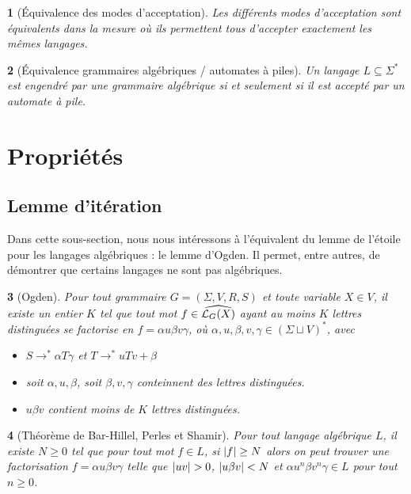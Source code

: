 \documentclass[11pt,a4paper]{article}
\theoremstyle{plain}
\newtheorem{thm}{\protect\theoremname}
\theoremstyle{definition}
\theoremstyle{definition}
\theoremstyle{remark}
\theoremstyle{remark}
\theoremstyle{plain}
\newtheorem{lem}[thm]{\protect\lemmaname}
\theoremstyle{plain}
\newtheorem{prop}[thm]{\protect\propositionname}
\theoremstyle{plain}
\newtheorem{cor}[thm]{\protect\corollaryname}
\theoremstyle{remark}
\providecommand{\corollaryname}{Corollaire}
\providecommand{\lemmaname}{Lemme}
\providecommand{\propositionname}{Proposition}
\providecommand{\theoremname}{Théorème}
\begin{document}
\begin{prop}[Équivalence des modes d'acceptation]
	Les différents modes d'acceptation sont équivalents dans la mesure où ils permettent tous d'accepter exactement les mêmes langages.	
\end{prop}

\begin{thm}[Équivalence grammaires algébriques / automates à piles]\label{th:equiv}
	Un langage $L\subseteq\Sigma^*$ est engendré par une grammaire algébrique si et seulement si il est accepté par un automate à pile.	
\end{thm}

\section{Propriétés}

\subsection{Lemme d'itération} %

Dans cette sous-section, nous nous intéressons à l'équivalent du lemme de l'étoile pour les langages algébriques : le lemme d'Ogden. Il permet, entre autres, de démontrer que certains langages ne sont pas algébriques.

\begin{lem}[Ogden]\label{th:ogden}
	Pour tout grammaire $G=(\Sigma,V,R,S)$ et toute variable $X\in V$, il existe un entier $K$ tel que tout mot $f\in \widehat{\mathcal{L}_G(X)}$ ayant au moins $K$ lettres distinguées se factorise en $f=\alpha u \beta v \gamma$, où $\alpha,u,\beta,v,\gamma\in (\Sigma\sqcup V)^*$, avec
	\begin{itemize}
		\item $S\to^*\alpha T \gamma$ et $T\to ^*uTv+\beta$
		\item soit $\alpha, u, \beta$, soit $\beta, v, \gamma$ conteinnent des lettres distinguées.
		\item $u\beta v$ contient moins de $K$ lettres distinguées.
	\end{itemize}
\end{lem}

\begin{cor}[Théorème de Bar-Hillel, Perles et Shamir]\label{th:bhs}
	Pour tout langage algébrique $L$, il existe $N\ge 0$ tel que pour tout mot $f\in L$, si $\left|f\right|\ge N$ alors on peut trouver une factorisation $f=\alpha u \beta v \gamma$ telle que $\abs{uv}>0$, $\left|u\beta v\right|<N$ et $\alpha u^n \beta v^n \gamma\in L$ pour tout $n\ge 0$.	
\end{cor}
\end{document}
